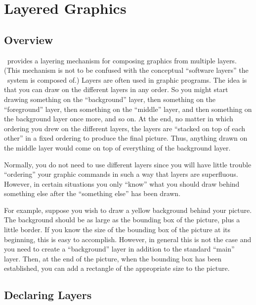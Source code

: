 %
%
%


\section[base-layers]{Layered Graphics}
\label{section-layers}

\subsection{Overview}

\pgfname\ provides a layering mechanism for composing graphics from multiple
layers. (This mechanism is not to be confused with the conceptual ``software
layers'' the \pgfname\ system is composed of.) Layers are often used in graphic
programs. The idea is that you can draw on the different layers in any order.
So you might start drawing something on the ``background'' layer, then
something on the ``foreground'' layer, then something on the ``middle'' layer,
and then something on the background layer once more, and so on. At the end, no
matter in which ordering you drew on the different layers, the layers are
``stacked on top of each other'' in a fixed ordering to produce the final
picture. Thus, anything drawn on the middle layer would come on top of
everything of the background layer.

Normally, you do not need to use different layers since you will have little
trouble ``ordering'' your graphic commands in such a way that layers are
superfluous. However, in certain situations you only ``know'' what you should
draw behind something else after the ``something else'' has been drawn.

For example, suppose you wish to draw a yellow background behind your picture.
The background should be as large as the bounding box of the picture, plus a
little border. If you know the size of the bounding box of the picture at its
beginning, this is easy to accomplish. However, in general this is not the case
and you need to create a ``background'' layer in addition to the standard
``main'' layer. Then, at the end of the picture, when the bounding box has been
established, you can add a rectangle of the appropriate size to the picture.


\subsection{Declaring Layers}

